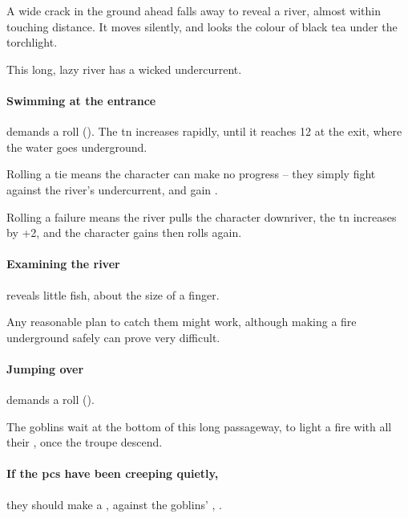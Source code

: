 \begin{multicols}{2}
\begin{boxtext}
  A wide crack in the ground ahead falls away to reveal a river, almost within touching distance.
  It moves silently, and looks the colour of black tea under the torchlight.
\end{boxtext}


This long, lazy river has a wicked undercurrent.

\paragraph{Swimming at the entrance}
demands a  roll (\tn[5]).
The \gls{tn} increases rapidly, until it reaches 12 at the exit, where the water goes underground.

Rolling a tie means the character can make no progress -- they simply fight against the river's undercurrent, and gain .

Rolling a failure means the river pulls the character downriver, the \gls{tn} increases by +2, and the character gains  then rolls again.

\paragraph{Examining the river}
reveals little fish, about the size of a finger.

Any reasonable plan to catch them might work, although making a fire underground safely can prove very difficult.%

\paragraph{Jumping over}
demands a  roll (\tn[12]).


The goblins wait at the bottom of this long passageway, to light a fire with all their \fireFuel, once the troupe descend.




\paragraph{If the \glspl{pc} have been creeping quietly,}
they should make a , against the goblins' , \tn.


\end{multicols}
